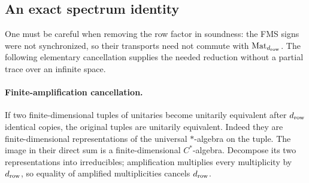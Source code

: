 \subsection{An exact spectrum identity}
One must be careful when removing the row factor in soundness: the FMS signs were not synchronized, so their transports need not commute with $\mathrm{Mat}_{d_{\mathrm{row}}}$. The following elementary cancellation supplies the needed reduction without a partial trace over an infinite space.

\paragraph{Finite-amplification cancellation.}
If two finite-dimensional tuples of unitaries become unitarily equivalent after $d_{\mathrm{row}}$ identical copies, the original tuples are unitarily equivalent. Indeed they are finite-dimensional representations of the universal $*$-algebra on the tuple. The image in their direct sum is a finite-dimensional $C^*$-algebra. Decompose its two representations into irreducibles; amplification multiplies every multiplicity by $d_{\mathrm{row}}$, so equality of amplified multiplicities cancels $d_{\mathrm{row}}$.

